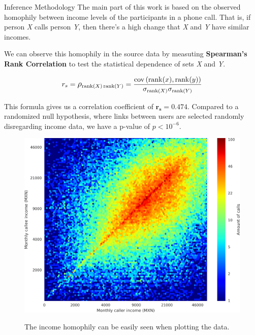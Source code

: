 \documentclass{beamer}
\begin{document}
\begin{frame}{Inference Methodology}
The main part of this work is based on the observed homophily between income levels of the participants in a phone call. That is, if person \emph{X} calls person \emph{Y}, then there's a high change that \emph{X} and \emph{Y} have similar incomes.
	
We can observe this homophily in the source data by measuting \textbf{Spearman's Rank Correlation} to test the statistical dependence of sets \emph{X} and \emph{Y}.

\[
	r_s = \mathlarger{\rho}_{\operatorname{rank}(X) \operatorname{rank}(Y)} = \frac{\operatorname{cov} \left( \operatorname{rank}(x), \operatorname{rank}(y) \right)}{\sigma_{\operatorname{rank}(X)} \sigma_{\operatorname{rank}(Y)}}
\]

This formula gives us a correlation coefficient of \( \mathbf{r_s = 0.474} \). Compared to a randomized null hypothesis, where links between users are selected randomly disregarding income data, we have a p-value of \( p < 10^{-6} \).

\end{frame}
\begin{frame}

\begin{figure}[h]
	\begin{center}
		{\includegraphics[height=0.8\textheight]
		{Homophily_income_origin_target_1.png}
		}\label{homophily_heatmap}
	\end{center}
	\caption{The income homophily can be easily seen when plotting the data.}
\end{figure}

\end{frame}
\end{document}

